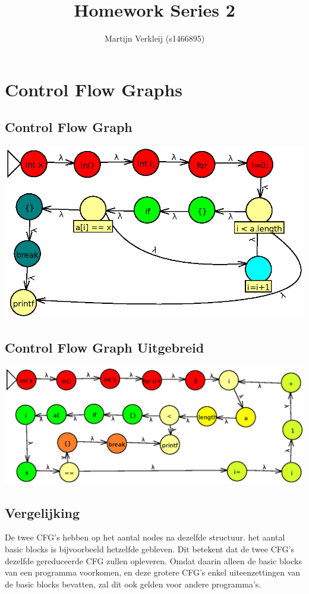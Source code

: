 \documentclass[10pt,a4paper,titlepage]{report}
\author{Martijn Verkleij (s1466895)}
\title{Homework Series 2}
\begin{document}
\maketitle

\chapter{Control Flow Graphs}

\section{Control Flow Graph}
\includegraphics[width=\textwidth]{q2_1/q1_1.eps} 

\section{Control Flow Graph Uitgebreid}
\includegraphics[width=\textwidth]{q2_1/q1_2.eps}

\section{Vergelijking}
De twee CFG's hebben op het aantal nodes na dezelfde structuur. het aantal basic blocks is bijvoorbeeld hetzelfde gebleven. Dit betekent dat de twee CFG's dezelfde gereduceerde CFG zullen opleveren. Omdat daarin alleen de basic blocks van een programma voorkomen, en deze grotere CFG's enkel uiteenzettingen van de basic blocks bevatten, zal dit ook gelden voor andere programma's.
\end{document}
